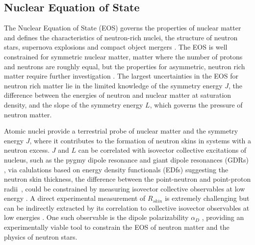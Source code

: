\documentclass[cnatzke_thesis_proposal.tex]{subfiles}
\begin{document}
\subsection{Nuclear Equation of State}
The Nuclear Equation of State (EOS) governs the properties of nuclear matter and defines the characteristics of neutron-rich nuclei, the structure of neutron stars, supernova explosions and compact object mergers \cite{knupfer_scaling_1985}. 
The EOS is well constrained for symmetric nuclear matter, matter where the number of protons and neutrons are roughly equal, but the properties for asymmetric, neutron rich matter require further investigation \cite{danielewicz_determination_2002}.
The largest uncertainties in the EOS for neutron rich matter lie in the limited knowledge of the symmetry energy $J$, the difference between the energies of neutron and nuclear matter at saturation density, and the slope of the symmetry energy $L$, which governs the pressure of neutron matter. 

Atomic nuclei provide a terrestrial probe of nuclear matter and the symmetry energy $J$, where it contributes to the formation of neutron skins in systems with a neutron excess. 
$J$ and $L$ can be correlated with isovector collective excitations of nucleus, such as the pygmy dipole resonance \cite{carbone_constraints_2010} and giant dipole resonances (GDRs) \cite{trippa_giant_2008}, via calulations based on energy density functionals (EDfs) suggesting the neutron skin thickness, the difference between the point-neutron and point-proton radii~\cite{tsang_constraints_2012}, could be constrained by measuring isovector collective observables at low energy \cite{krasznahorkay_excitation_1999}.
A direct experimental measurement of $R_{skin}$ is extremely challenging but can be indirectly extracted by its correlation to collective isovector observables at low energies \cite{birkhan_electric_2017}. 
One such observable is the dipole polarizability $\alpha_D$ \cite{birkhan_electric_2017}, providing an experimentally viable tool to constrain the EOS of neutron matter and the physics of neutron stars. 

\end{document}
